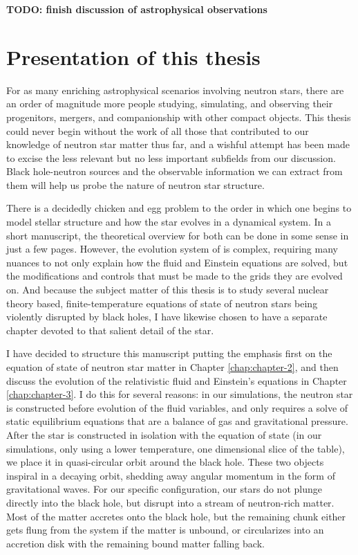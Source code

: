 \textbf{TODO: finish discussion of astrophysical observations}

\section{Presentation of this thesis}

For as many enriching astrophysical scenarios involving neutron stars, there are an order of magnitude more people studying, simulating, and observing their progenitors, mergers, and companionship with other compact objects.
This thesis could never begin without the work of all those that contributed to our knowledge of neutron star matter thus far, and a wishful attempt has been made to excise the less relevant but no less important subfields from our discussion.
Black hole-neutron sources and the observable information we can extract from them will help us probe the nature of neutron star structure.

There is a decidedly chicken and egg problem to the order in which one begins to model stellar structure and how the star evolves in a dynamical system.
In a short manuscript, the theoretical overview for both can be done in some sense in just a few pages. 
However, the evolution system of \SpEC is complex, requiring many nuances to not only explain how the fluid and Einstein equations are solved, but the modifications and controls that must be made to the grids they are evolved on.
And because the subject matter of this thesis is to study several nuclear theory based, finite-temperature equations of state of neutron stars being violently disrupted by black holes, I have likewise chosen to have a separate chapter devoted to that salient detail of the star.

I have decided to structure this manuscript putting the emphasis first on the equation of state of neutron star matter in Chapter \ref{chap:chapter-2}, and then discuss the evolution of the relativistic fluid and Einstein's equations in Chapter \ref{chap:chapter-3}.  
I do this for several reasons: in our simulations, the neutron star is constructed before evolution of the fluid variables, and only requires a solve of static equilibrium equations that are a balance of gas and gravitational pressure.  After the star is constructed in isolation with the equation of state (in our simulations, only using a lower temperature, one dimensional slice of the table), we place it in quasi-circular orbit around the black hole.  
These two objects inspiral in a decaying orbit, shedding away angular momentum in the form of gravitational waves.  
For our specific configuration, our stars do not plunge directly into the black hole, but disrupt into a stream of neutron-rich matter. 
Most of the matter accretes onto the black hole, but the remaining chunk either gets flung from the system if the matter is unbound, or circularizes into an accretion disk with the remaining bound matter falling back.